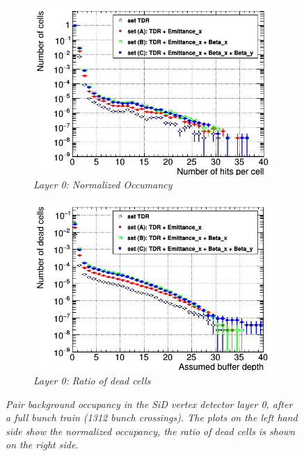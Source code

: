 \begin{figure}[h!]
\centering
\begin{subfigure}[t]{0.45\textwidth}
\centering
\includegraphics[width=1.05\textwidth]{figures/Occupancy_Comparison_Layer_0_numcells_ILC250_Comparison_ALL_SETS_5T_w_antiDiD_LEG.png}
\caption{\textit{Layer 0: Normalized Occumancy}}
\end{subfigure}
\hspace*{0.3cm}
\begin{subfigure}[t]{0.45\textwidth}
\centering
\includegraphics[width=1.05\textwidth]{figures/Occupancy_Comparison_Layer_0_deadcells_ILC250_Comparison_ALL_SETS_5T_w_antiDiD_LEG.png}
\caption{\textit{Layer 0: Ratio of dead cells}}
\end{subfigure}
\caption{\textit{Pair background occupancy in the SiD vertex detector layer 0, after a full bunch train (1312 bunch crossings).
The plots on the left hand side show the normalized occupancy, the ratio of dead cells is shown on the right side.}}
\label{fig:Layer0_Occupancy}
\end{figure}

